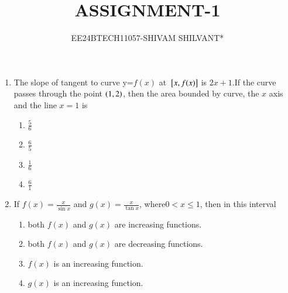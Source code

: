 \documentclass[journal]{IEEEtran}
\begin{document}

\onecolumn


\title{ASSIGNMENT-1}
\author{EE24BTECH11057-SHIVAM SHILVANT*}
\maketitle

\bigskip

\renewcommand{\thefigure}{\theenumi}
\renewcommand{\thetable}{\theenumi}
\begin{enumerate}[start=9]
\item The slope of tangent to curve y=$f(x)$ at ${}\left[x,f(x)\right]$ is $2x + 1$.If the curve passes through the point $\left(1,2\right)$, then the area bounded by curve, the $x$ axis and the line $x=1$ is
\hfill {}
\begin{multicols}{4}
\begin{enumerate}
    \item $\displaystyle\frac{5}{6}$\\ 
    \item $\displaystyle\frac{6}{5}$\\
    \item $\displaystyle\frac{1}{6}$\\ 
    \item $\displaystyle\frac{6}{1}$\\
\end{enumerate}
\end{multicols}
\item If $f(x)=\displaystyle\frac{x}{\sin{x}}$ and $g(x)=\displaystyle\frac{x}{\tan{x}}$, where$0<x\leq1$, then in this interval
\hfill {}
\begin{enumerate}
    \item both $f(x)$ and $g(x)$ are increasing functions.
    \item both $f(x)$ and $g(x)$ are decreasing functions.
    \item $f(x)$ is an increasing function.
    \item $g(x)$ is an increasing function.\\
\end{enumerate}


\end{enumerate}
\end{document}
